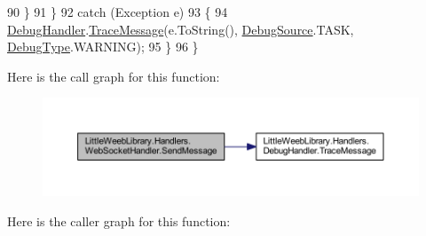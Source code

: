 \begin{DoxyCode}
90                 \}
91             \}
92             \textcolor{keywordflow}{catch} (Exception e)
93             \{
94                 \mbox{\hyperlink{class_little_weeb_library_1_1_handlers_1_1_web_socket_handler_aa1474285fe938f284633c31403bf9edf}{DebugHandler}}.\mbox{\hyperlink{interface_little_weeb_library_1_1_handlers_1_1_i_debug_handler_a2e405bc3492e683cd3702fae125221bc}{TraceMessage}}(e.ToString(), 
      \mbox{\hyperlink{namespace_little_weeb_library_1_1_handlers_a2a6ca0775121c9c503d58aa254d292be}{DebugSource}}.TASK, \mbox{\hyperlink{namespace_little_weeb_library_1_1_handlers_ab66019ed40462876ec4e61bb3ccb0a62}{DebugType}}.WARNING);
95             \}
96         \}
\end{DoxyCode}
Here is the call graph for this function\+:\nopagebreak
\begin{figure}[H]
\begin{center}
\leavevmode
\includegraphics[width=350pt]{class_little_weeb_library_1_1_handlers_1_1_web_socket_handler_a1de289d54d665a32c93478c68d3e6ad0_cgraph}
\end{center}
\end{figure}
Here is the caller graph for this function\+:\nopagebreak
